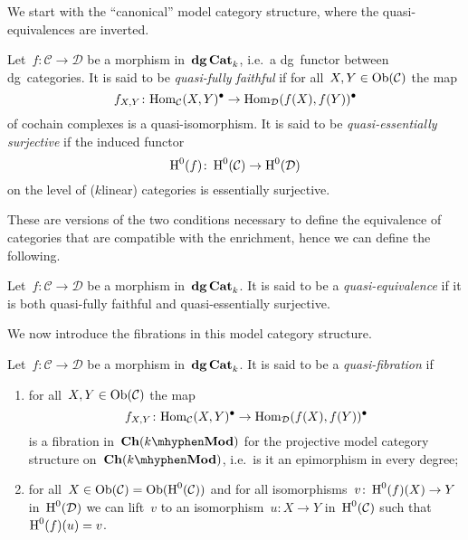 We start with the ``canonical'' model category structure, where the quasi-equivalences are inverted.
\begin{definition}
  Let~$f\colon\mathcal{C}\to\mathcal{D}$ be a morphism in~$\mathbf{dg\,Cat}_k$, i.e.\ a dg~functor between dg~categories. It is said to be \emph{quasi-fully faithful} if for all~$X,Y\in\mathrm{Ob}(\mathcal{C})$ the map
  \begin{equation}
    f_{X,Y}\colon\mathrm{Hom}_{\mathcal{C}}(X,Y)^\bullet\to\mathrm{Hom}_{\mathcal{D}}(f(X),f(Y))^\bullet
  \end{equation}
  of cochain complexes is a quasi-isomorphism. It is said to be \emph{quasi-essentially surjective} if the induced functor
  \begin{equation}
    \operatorname{H}^0(f)\colon\operatorname{H}^0(\mathcal{C})\to\operatorname{H}^0(\mathcal{D})
  \end{equation}
  on the level of ($k$\dash linear) categories is essentially surjective.
\end{definition}
These are versions of the two conditions necessary to define the equivalence of categories that are compatible with the enrichment, hence we can define the following.
\begin{definition}
  Let~$f\colon\mathcal{C}\to\mathcal{D}$ be a morphism in~$\mathbf{dg\,Cat}_k$. It is said to be a \emph{quasi-equivalence} if it is both quasi-fully faithful and quasi-essentially surjective.
\end{definition}
We now introduce the fibrations in this model category structure.
\begin{definition}
  \label{definition:quasi-fibration}
  Let~$f\colon\mathcal{C}\to\mathcal{D}$ be a morphism in~$\mathbf{dg\,Cat}_k$. It is said to be a \emph{quasi-fibration} if
  \begin{enumerate}
    \item for all~$X,Y\in\mathrm{Ob}(\mathcal{C})$ the map
      \begin{equation}
        f_{X,Y}\colon\mathrm{Hom}_{\mathcal{C}}(X,Y)^\bullet\to\mathrm{Hom}_{\mathcal{D}}(f(X),f(Y))^\bullet
      \end{equation}
      is a fibration in~$\Ch(k\mhyphen\Mod)$ for the projective model category structure on~$\Ch(k\mhyphen\Mod)$, i.e.\ is it an epimorphism in every degree;
    \item for all~$X\in\mathrm{Ob}(\mathcal{C})=\mathrm{Ob}(\operatorname{H}^0(\mathcal{C}))$ and for all isomorphisms~$v\colon\operatorname{H}^0(f)(X)\to Y$ in~$\operatorname{H}^0(\mathcal{D})$ we can lift~$v$ to an isomorphism~$u\colon X\to Y$ in~$\operatorname{H}^0(\mathcal{C})$ such that~$\operatorname{H}^0(f)(u)=v$.
  \end{enumerate}
\end{definition}

